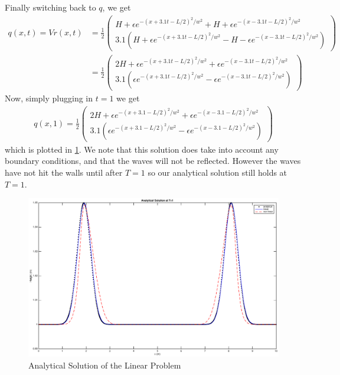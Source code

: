 Finally switching back to $q$, we get 
\begin{align*}
q(x,t) = Vr(x,t) &= \frac{1}{2} \begin{pmatrix}
H + \epsilon e^{-(x+3.1t-L/2)^2/w^2} +H + \epsilon e^{-(x-3.1t-L/2)^2/w^2} \\
3.1(H + \epsilon e^{-(x+3.1t-L/2)^2/w^2} -H - \epsilon e^{-(x-3.1t-L/2)^2/w^2})
\end{pmatrix} \\
&= \frac{1}{2}\begin{pmatrix}
 2H + \epsilon e^{-(x+3.1t-L/2)^2/w^2} + \epsilon e^{-(x-3.1t-L/2)^2/w^2} \\
3.1( \epsilon e^{-(x+3.1t-L/2)^2/w^2} - \epsilon e^{-(x-3.1t-L/2)^2/w^2})
\end{pmatrix}
\end{align*} 
Now, simply plugging in $t=1$ we get
\begin{align*}
q(x,1) = \frac{1}{2}\begin{pmatrix}
 2H + \epsilon e^{-(x+3.1-L/2)^2/w^2} + \epsilon e^{-(x-3.1-L/2)^2/w^2} \\
3.1( \epsilon e^{-(x+3.1-L/2)^2/w^2} - \epsilon e^{-(x-3.1-L/2)^2/w^2})
\end{pmatrix}
\end{align*}
which is plotted in \ref{anal}.
We note that this solution does take into account any boundary conditions, and that the waves will not be reflected. However the waves have not hit the walls until after $T=1$ so our analytical solution still holds at $T=1$. 

\begin{figure}
\begin{center}
\includegraphics[scale=0.4]{analytical.eps}
\caption{Analytical Solution of the Linear Problem}
\label{anal}
\end{center}
\end{figure}

